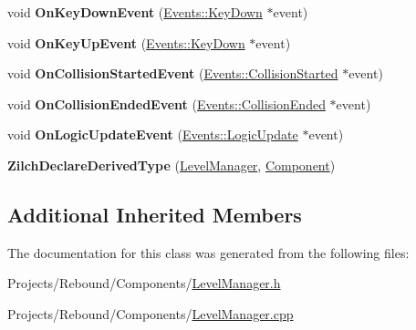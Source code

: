\begin{DoxyCompactItemize}
\item 
\hypertarget{classDCEngine_1_1Components_1_1LevelManager_ad3d4729ffe91ccf24114abf4d4414919}{void {\bfseries On\-Key\-Down\-Event} (\hyperlink{classDCEngine_1_1Events_1_1KeyDown}{Events\-::\-Key\-Down} $\ast$event)}\label{classDCEngine_1_1Components_1_1LevelManager_ad3d4729ffe91ccf24114abf4d4414919}

\item 
\hypertarget{classDCEngine_1_1Components_1_1LevelManager_a5933a8860fefd450a5bc0d9464a74f2a}{void {\bfseries On\-Key\-Up\-Event} (\hyperlink{classDCEngine_1_1Events_1_1KeyDown}{Events\-::\-Key\-Down} $\ast$event)}\label{classDCEngine_1_1Components_1_1LevelManager_a5933a8860fefd450a5bc0d9464a74f2a}

\item 
\hypertarget{classDCEngine_1_1Components_1_1LevelManager_ac4829584f61e7f4b58fcecd4c8b66ec7}{void {\bfseries On\-Collision\-Started\-Event} (\hyperlink{classDCEngine_1_1Events_1_1CollisionStarted}{Events\-::\-Collision\-Started} $\ast$event)}\label{classDCEngine_1_1Components_1_1LevelManager_ac4829584f61e7f4b58fcecd4c8b66ec7}

\item 
\hypertarget{classDCEngine_1_1Components_1_1LevelManager_a4b6ad2e2f2b4144094fd35c4dd9f2628}{void {\bfseries On\-Collision\-Ended\-Event} (\hyperlink{classDCEngine_1_1Events_1_1CollisionEnded}{Events\-::\-Collision\-Ended} $\ast$event)}\label{classDCEngine_1_1Components_1_1LevelManager_a4b6ad2e2f2b4144094fd35c4dd9f2628}

\item 
\hypertarget{classDCEngine_1_1Components_1_1LevelManager_a52a36a58ccad573959564ec92192945b}{void {\bfseries On\-Logic\-Update\-Event} (\hyperlink{classDCEngine_1_1Events_1_1LogicUpdate}{Events\-::\-Logic\-Update} $\ast$event)}\label{classDCEngine_1_1Components_1_1LevelManager_a52a36a58ccad573959564ec92192945b}

\item 
\hypertarget{classDCEngine_1_1Components_1_1LevelManager_a1eca3045d34a2568ed7dfb82593cd4c2}{{\bfseries Zilch\-Declare\-Derived\-Type} (\hyperlink{classDCEngine_1_1Components_1_1LevelManager}{Level\-Manager}, \hyperlink{classDCEngine_1_1Component}{Component})}\label{classDCEngine_1_1Components_1_1LevelManager_a1eca3045d34a2568ed7dfb82593cd4c2}

\end{DoxyCompactItemize}
\subsection*{Additional Inherited Members}


The documentation for this class was generated from the following files\-:\begin{DoxyCompactItemize}
\item 
Projects/\-Rebound/\-Components/\hyperlink{LevelManager_8h}{Level\-Manager.\-h}\item 
Projects/\-Rebound/\-Components/\hyperlink{LevelManager_8cpp}{Level\-Manager.\-cpp}\end{DoxyCompactItemize}
